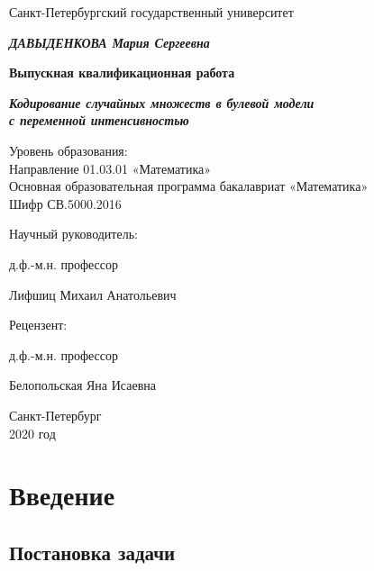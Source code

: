 \documentclass[12pt]{article}
\theoremstyle{plain}
\theoremstyle{definition}
\theoremstyle{remark}
\begin{document}
\thispagestyle{empty}%

\centerline{Санкт-Петербургский государственный университет}

\vspace{2.5cm}

\begin{center}
  \textbf{\textit{ДАВЫДЕНКОВА Мария Сергеевна}}
  \bigskip
  
\textbf{Выпускная квалификационная работа}
\bigskip

\textbf{\textit{Кодирование случайных множеств в булевой модели\\ с переменной интенсивностью}}
\end{center}

\vspace{1.3cm}

\begin{center}
    Уровень образования:\\
Направление 01.03.01 «Математика»\\
Основная образовательная программа бакалавриат «Математика» \\
Шифр СВ.5000.2016
\end{center}

\vspace{3cm}

{\parindent=9.2cm 
	Научный руководитель: \par
	д.ф.-м.н. профессор \par
	Лифшиц Михаил Анатольевич \par} 
	
\vspace{1.3cm}
{\parindent=9.2cm 
	Рецензент: \par
	д.ф.-м.н. профессор \par
	Белопольская Яна Исаевна \par}

\vspace{3cm}
\begin{center}
	Санкт-Петербург \\
	2020 год
\end{center}

\tableofcontents

\newpage
\section{Введение}
\subsection{Постановка задачи}
\end{document}
